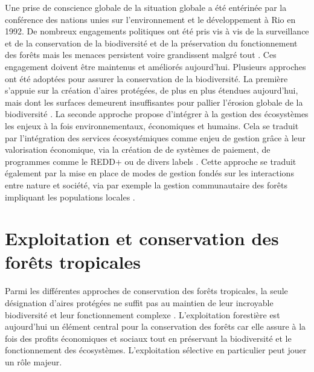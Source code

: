 \documentclass[
  11pt,
  french,
  A4paper,
  extrafontsizes,onecolumn,openright
  ]{memoir}
\begin{document}
Une prise de conscience globale de la situation globale a été entérinée
par la conférence des nations unies sur l'environnement et le
développement à Rio en 1992. De nombreux engagements politiques ont été
pris vis à vis de la surveillance et de la conservation de la
biodiversité et de la préservation du fonctionnement des forêts mais les
menaces persistent voire grandissent malgré tout
\autocites{Summit1992}{Schlaepfer2000}{Dirzo2003a}{Morales-Hidalgo2015}.
Ces engagement doivent être maintenus et améliorés aujourd'hui.
Plusieurs approches ont été adoptées pour assurer la conservation de la
biodiversité. La première s'appuie sur la création d'aires protégées, de
plus en plus étendues aujourd'hui, mais dont les surfaces demeurent
insuffisantes pour pallier l'érosion globale de la biodiversité
\autocite{Sist2015}. La seconde approche propose d'intégrer à la gestion
des écosystèmes les enjeux à la fois environnementaux, économiques et
humains. Cela se traduit par l'intégration des services écosystémiques
comme enjeu de gestion grâce à leur valorisation économique, via la
création de de systèmes de paiement, de programmes comme le REDD+ ou de
divers labels \autocites{Agrawal2011}{Barlow2018}. Cette approche se
traduit également par la mise en place de modes de gestion fondés sur
les interactions entre nature et société, via par exemple la gestion
communautaire des forêts impliquant les populations locales
\autocite{Liu2015}.

\section{Exploitation et conservation des forêts
tropicales}\label{exploitation-et-conservation-des-forets-tropicales}

Parmi les différentes approches de conservation des forêts tropicales,
la seule désignation d'aires protégées ne suffit pas au maintien de leur
incroyable biodiversité et leur fonctionnement complexe
\autocite{Sist2015}. L'exploitation forestière est aujourd'hui un
élément central pour la conservation des forêts car elle assure à la
fois des profits économiques et sociaux tout en préservant la
biodiversité et le fonctionnement des écosystèmes. L'exploitation
sélective en particulier peut jouer un rôle majeur.
\end{document}
